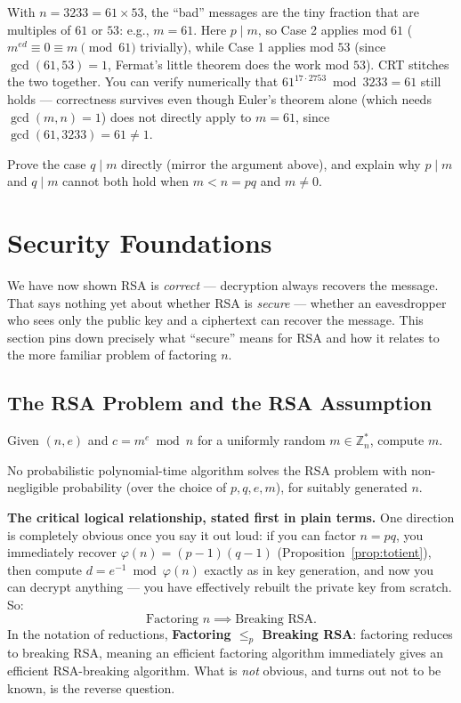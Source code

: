 \begin{example}
With $n = 3233 = 61 \times 53$, the ``bad'' messages are the tiny fraction that are multiples of $61$ or $53$: e.g., $m = 61$. Here $p \mid m$, so Case 2 applies mod $61$ ($m^{ed} \equiv 0 \equiv m \pmod{61}$ trivially), while Case 1 applies mod $53$ (since $\gcd(61,53)=1$, Fermat's little theorem does the work mod $53$). CRT stitches the two together. You can verify numerically that $61^{17 \cdot 2753} \bmod 3233 = 61$ still holds — correctness survives even though Euler's theorem alone (which needs $\gcd(m,n)=1$) does not directly apply to $m=61$, since $\gcd(61,3233)=61 \ne 1$.
\end{example}

\begin{exercise}
Prove the case $q \mid m$ directly (mirror the argument above), and explain why $p \mid m$ and $q \mid m$ cannot both hold when $m < n = pq$ and $m \ne 0$.
\end{exercise}

\newpage
\section{Security Foundations}

We have now shown RSA is \emph{correct} — decryption always recovers the message. That says nothing yet about whether RSA is \emph{secure} — whether an eavesdropper who sees only the public key and a ciphertext can recover the message. This section pins down precisely what ``secure'' means for RSA and how it relates to the more familiar problem of factoring $n$.

\subsection{The RSA Problem and the RSA Assumption}

\begin{definition}
Given $(n, e)$ and $c = m^e \bmod n$ for a uniformly random $m \in \mathbb{Z}_n^{*}$, compute $m$.
\end{definition}

\begin{definition}
No probabilistic polynomial-time algorithm solves the RSA problem with non-negligible probability (over the choice of $p, q, e, m$), for suitably generated $n$.
\end{definition}

\medskip\noindent\textbf{The critical logical relationship, stated first in plain terms.} One direction is completely obvious once you say it out loud: if you can factor $n=pq$, you immediately recover $\varphi(n)=(p-1)(q-1)$ (Proposition~\ref{prop:totient}), then compute $d=e^{-1}\bmod\varphi(n)$ exactly as in key generation, and now you can decrypt anything — you have effectively rebuilt the private key from scratch. So:
\[
\text{Factoring } n \implies \text{Breaking RSA}.
\]
In the notation of reductions, \textbf{Factoring $\leq_p$ Breaking RSA}: factoring reduces to breaking RSA, meaning an efficient factoring algorithm immediately gives an efficient RSA-breaking algorithm. What is \emph{not} obvious, and turns out not to be known, is the reverse question.

